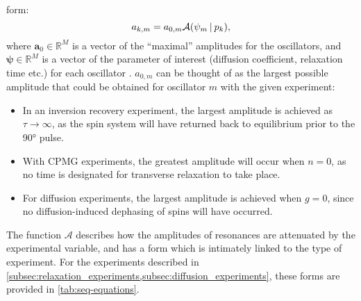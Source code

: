 form:
\begin{equation}
    a_{k,m} = a_{0,m} \mathcal{A} (\psi_m \hspace*{2pt} | \hspace*{2pt} p_k),
\end{equation}
where $\symbf{a}_0 \in \mathbb{R}^{M}$ is a vector of the ``maximal''
amplitudes for the oscillators, and $\symbf{\psi} \in \mathbb{R}^M$ is a vector
of the parameter of interest (diffusion coefficient, relaxation time etc.) for
each oscillator . $a_{0,m}$ can be thought of as the largest
possible amplitude that could be obtained for oscillator $m$ with the given
experiment:
\begin{itemize}
    \item In an inversion recovery experiment, the largest amplitude is
        achieved as $\tau \rightarrow \infty$, as the spin system will have
        returned back to equilibrium prior to the \ang{90} pulse.
    \item With \ac{CPMG} experiments, the greatest amplitude will occur when
        $n = 0$, as no time is designated for transverse
        relaxation to take place.
    \item For diffusion experiments, the largest amplitude is achieved when
        $g=0$, since no diffusion-induced dephasing of spins will have
        occurred.
\end{itemize}
The function $\mathcal{A}$ describes how the amplitudes of resonances are
attenuated by the experimental variable, and has a form which is intimately
linked to the type of experiment. For the experiments described in
\cref{subsec:relaxation_experiments,subsec:diffusion_experiments},
these forms are provided in \cref{tab:seq-equations}.
